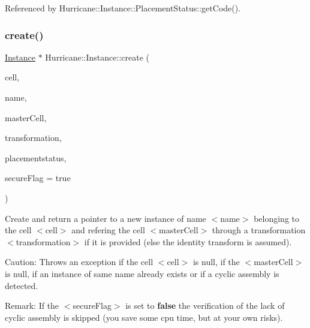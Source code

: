 Referenced by Hurricane\+::\+Instance\+::\+Placement\+Status\+::get\+Code().

\mbox{\label{classHurricane_1_1Instance_ad5784305151e45c9d949a74bd85aaa36}} 
\subsubsection{\texorpdfstring{create()}{create()}\hspace{0.1cm}{\footnotesize\ttfamily [2/2]}}
{\footnotesize\ttfamily \hyperlink{classHurricane_1_1Instance}{Instance} $\ast$ Hurricane\+::\+Instance\+::create (\begin{DoxyParamCaption}\item[{\hyperlink{classHurricane_1_1Cell}{Cell} $\ast$}]{cell,  }\item[{const \hyperlink{classHurricane_1_1Name}{Name} \&}]{name,  }\item[{\hyperlink{classHurricane_1_1Cell}{Cell} $\ast$}]{master\+Cell,  }\item[{const \hyperlink{classHurricane_1_1Transformation}{Transformation} \&}]{transformation,  }\item[{const \hyperlink{classHurricane_1_1Instance_1_1PlacementStatus}{Placement\+Status} \&}]{placementstatus,  }\item[{bool}]{secure\+Flag = {\ttfamily true} }\end{DoxyParamCaption})\hspace{0.3cm}{\ttfamily [static]}}

Create and return a pointer to a new instance of name {\ttfamily $<$name$>$} belonging to the cell {\ttfamily $<$cell$>$} and refering the cell {\ttfamily $<$master\+Cell$>$} through a transformation {\ttfamily $<$transformation$>$} if it is provided (else the identity transform is assumed).

\begin{DoxyParagraph}{Caution\+:}
Throws an exception if the cell {\ttfamily $<$cell$>$} is null, if the {\ttfamily $<$master\+Cell$>$} is null, if an instance of same name already exists or if a cyclic assembly is detected.
\end{DoxyParagraph}
\begin{DoxyParagraph}{Remark\+:}
If the {\ttfamily $<$secure\+Flag$>$} is set to {\bfseries false} the verification of the lack of cyclic assembly is skipped (you save some cpu time, but at your own risks). 
\end{DoxyParagraph}
\mbox{\label{classHurricane_1_1Instance_aa48280b4d7127d283c89983cf7a42c23}} 
